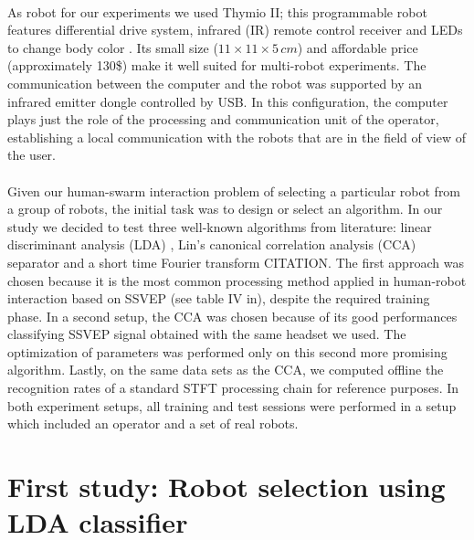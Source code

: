 \documentclass[smallextended]{svjour3}
\begin{document}
\\
As robot for our experiments we used Thymio II; this programmable robot features differential drive system, infrared (IR) remote control receiver and LEDs to change body color \cite{Riedo-et-al-2013}. Its small size ($11 \times 11 \times 5\,\mathit{cm}$) and affordable price (approximately 130\$) make it well suited for multi-robot experiments. 
The communication between the computer and the robot was supported by an infrared emitter dongle controlled by USB. 
In this configuration, the computer plays just the role of the processing and communication unit of the operator, establishing a local communication with the robots that are in the field of view of the user.\\
\\
Given our human-swarm interaction problem of selecting a particular robot from a group of robots, the initial task was to design or select an algorithm. In our study we decided to test three well-known algorithms from literature: linear discriminant analysis (LDA) \cite{openvibeSSVEP}, Lin's canonical correlation analysis (CCA) separator \cite{Lin2014}
and a short time Fourier transform CITATION. The first approach was chosen because it is the most common processing method applied in human-robot interaction based on SSVEP (see table IV in\cite{Bi2013}), despite the required training phase.
In a second setup, the CCA was chosen because of its good performances classifying SSVEP signal obtained with the same headset we used. The optimization of parameters was performed only on this second more promising algorithm.
Lastly, on the same data sets as the CCA, we computed offline the recognition rates of a standard STFT processing chain for reference purposes.
In both experiment setups, all training and test sessions were performed in a setup which included an operator and a set of real robots.\\

\section{First study: Robot selection using LDA classifier}
\label{sec:ML_approach}
\end{document}
